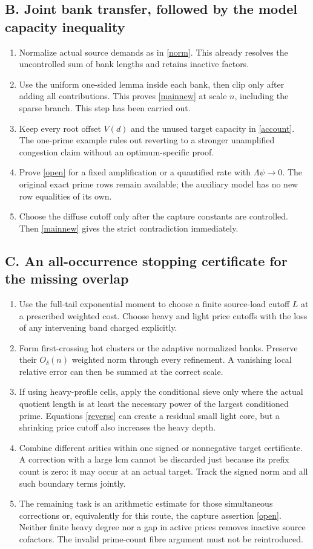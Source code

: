 \documentclass[11pt,a4paper]{article}
\begin{document}
\subsection*{B. Joint bank transfer, followed by the model capacity inequality}
\begin{enumerate}
\item Normalize actual source demands as in \eqref{norm}. This already
resolves the uncontrolled sum of bank lengths and retains inactive factors.
\item Use the uniform one-sided lemma inside each bank, then clip only
after adding all contributions. This proves \eqref{mainnew} at scale $n$,
including the sparse branch. This step has been carried out.
\item Keep every root offset $V(d)$ and the unused target capacity in
\eqref{account}. The one-prime example rules out reverting to a stronger
unamplified congestion claim without an optimum-specific proof.
\item Prove \eqref{open} for a fixed amplification or a quantified rate
with $\Lambda\psi\to0$. The original exact prime rows remain available;
the auxiliary model has no new row equalities of its own.
\item Choose the diffuse cutoff only after the capture constants are
controlled. Then \eqref{mainnew} gives the strict contradiction immediately.
\end{enumerate}

\subsection*{C. An all-occurrence stopping certificate for the missing overlap}
\begin{enumerate}
\item Use the full-tail exponential moment to choose a finite source-load
cutoff $L$ at a prescribed weighted cost. Choose heavy and light price
cutoffs with the loss of any intervening band charged explicitly.
\item Form first-crossing hot clusters or the adaptive normalized banks.
Preserve their $O_\delta(n)$ weighted norm through every refinement. A
vanishing local relative error can then be summed at the correct scale.
\item If using heavy-profile cells, apply the conditional sieve only where
the actual quotient length is at least the necessary power of the largest
conditioned prime. Equations \eqref{reverse} can create a residual small
light core, but a shrinking price cutoff also increases the heavy depth.
\item Combine different arities within one signed or nonnegative target
certificate. A correction with a large lcm cannot be discarded just
because its prefix count is zero: it may occur at an actual target.
Track the signed norm and all such boundary terms jointly.
\item The remaining task is an arithmetic estimate for those simultaneous
corrections or, equivalently for this route, the capture assertion
\eqref{open}. Neither finite heavy degree nor a gap in active prices
removes inactive source cofactors. The invalid prime-count fibre argument
must not be reintroduced.
\end{enumerate}
\end{document}

